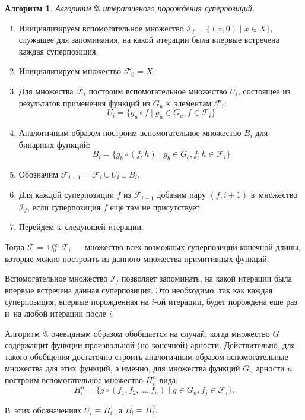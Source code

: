 \documentclass[12pt,a4paper]{amsart}
\newtheorem{algo}{Алгоритм}
\begin{document}
\begin{algo}
  Алгоритм $\mathfrak{A}$ итеративного порождения суперпозиций.
\end{algo}
\begin{enumerate}
  \item Инициализируем вспомогательное множество $\mathcal{I}_f = \{ (x, 0) \mid x \in X \}$,
	служащее для запоминания, на какой итерации была впервые встречена
	каждая суперпозиция.
  \item Инициализируем множество $\mathcal{F}_0 = X$.
  \item Для множества $\mathcal{F}_i$ построим вспомогательное множество $U_i$,
	состоящее из результатов применения функций из $G_u$ к~элементам $\mathcal{F}_i$:
	\[
	U_i = \{ g_u \circ f \mid g_u \in G_u, f \in \mathcal{F}_i \}
	\]
  \item Аналогичным образом построим вспомогательное множество $B_i$ для
	бинарных функций:
	\[
	B_i = \{ g_b \circ (f, h) \mid g_b \in G_b, f, h \in \mathcal{F}_i \}
	\]
  \item Обозначим $\mathcal{F}_{i+1} = \mathcal{F}_i \cup U_i \cup B_i$.
  \item Для каждой суперпозиции $f$ из $\mathcal{F}_{i+1}$ добавим пару
	$(f, i+1)$ в~множество $\mathcal{I}_f$, если суперпозиция $f$ еще там
	не присутствует.
  \item Перейдем к~следующей итерации. 
\end{enumerate}

Тогда $\mathcal{F} = \cup_0^\infty \mathcal{F}_i$ --- множество всех
возможных суперпозиций конечной длины, которые можно построить из
данного множества примитивных функций.

Вспомогательное множество $\mathcal{I}_f$ позволяет запоминать, на какой
итерации была впервые встречена данная суперпозиция. Это необходимо, так
как каждая суперпозиция, впервые порожденная на $i$-ой итерации, будет
порождена еще раз и~на любой итерации после $i$.

Алгоритм $\mathfrak{A}$ очевидным образом обобщается на случай, когда
множество $G$ содержащит функции произвольной (но конечной) арности.
Действительно, для такого обобщения достаточно строить аналогичным образом
вспомогательные множества для этих функций, а именно, для множества функций
$G_n$ арности $n$ построим вспомогательное множество $H_i^n$ вида:
\[
H_i^n = \{ g \circ (f_1, f_2, \dots, f_n) \mid g \in G_n, f_j \in \mathcal{F}_i \}.
\]

В~этих обозначениях $U_i \equiv H_i^1$, а $B_i \equiv H_i^2$.
\end{document}

